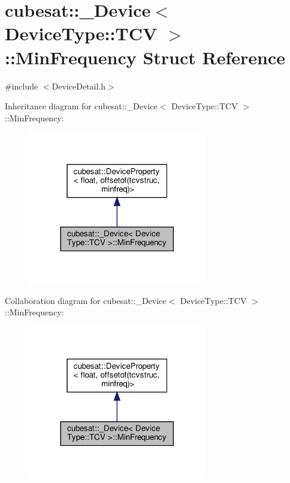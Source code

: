 \hypertarget{structcubesat_1_1__Device_3_01DeviceType_1_1TCV_01_4_1_1MinFrequency}{}\section{cubesat\+:\+:\+\_\+\+Device$<$ Device\+Type\+:\+:T\+CV $>$\+:\+:Min\+Frequency Struct Reference}
\label{structcubesat_1_1__Device_3_01DeviceType_1_1TCV_01_4_1_1MinFrequency}


{\ttfamily \#include $<$Device\+Detail.\+h$>$}



Inheritance diagram for cubesat\+:\+:\+\_\+\+Device$<$ Device\+Type\+:\+:T\+CV $>$\+:\+:Min\+Frequency\+:\nopagebreak
\begin{figure}[H]
\begin{center}
\leavevmode
\includegraphics[width=221pt]{structcubesat_1_1__Device_3_01DeviceType_1_1TCV_01_4_1_1MinFrequency__inherit__graph}
\end{center}
\end{figure}


Collaboration diagram for cubesat\+:\+:\+\_\+\+Device$<$ Device\+Type\+:\+:T\+CV $>$\+:\+:Min\+Frequency\+:\nopagebreak
\begin{figure}[H]
\begin{center}
\leavevmode
\includegraphics[width=221pt]{structcubesat_1_1__Device_3_01DeviceType_1_1TCV_01_4_1_1MinFrequency__coll__graph}
\end{center}
\end{figure}
